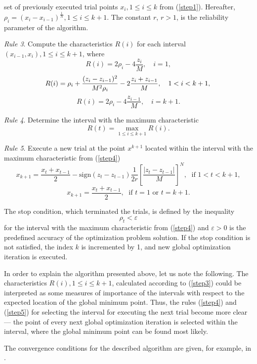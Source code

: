 \documentclass{aims}
\theoremstyle{definition}
\begin{document}
set of previously executed trial points \(x_i,1\leq i\leq k\) from (\ref{step1}).
Hereafter, \(\rho_i=(x_i-x_{i-1})^\frac{1}{N},1\leq i\leq k+1\). The
constant \(r\), \(r>1\), is the reliability parameter of the algorithm.
\par
\textit{Rule 3}. Compute the characteristics \(R(i)\) for each interval \((x_{i-1},x_i),1\leq i\leq k+1\), where
\[
R(i)=2\rho_i-4\frac{z_i}{M},\quad i=1,
\]
\begin{equation} \label{step3}
R(i)=\rho_i+\frac{(z_i-z_{i-1})^2}{M^2\rho_i}-2\frac{z_i+z_{i-1}}{M},\quad 1<i<k+1, \\
\end{equation}
\[
R(i)=2\rho_{i}-4\frac{z_{i-1}}{M},\quad i=k+1.
\]

\par
\textit{Rule 4}. Determine the interval with the maximum characteristic
\begin{equation} \label{step4}
R(t)=\max_{1\leq i \leq k+1}R(i).
\end{equation}
\par
\textit{Rule 5}. Execute a new trial at the point \(x^{k+1}\) located within the interval
with the maximum characteristic from (\ref{step4})
\begin{equation} \label{step5}
  x_{k+1}=\frac{x_t+x_{t-1}}{2}-\mathrm{sign}(z_{t}-z_{t-1})\frac{1}{2r}\left[\frac{|z_{t}-z_{t-1}|}{M}\right]^N,\; \textrm{ if } 1<t<k+1,
\end{equation}
\[
  x_{k+1}=\frac{x_t+x_{t-1}}{2},\; \textrm{ if } t=1 \textrm{ or } t=k+1.
\]

\par
The stop condition, which terminated the trials, is defined by the inequality
\begin{equation}
  \label{eq:stop_1}
\rho_t<\varepsilon
\end{equation}
for the interval with the maximum characteristic from (\ref{step4}) and \(\varepsilon >0\) is the predefined
accuracy of the optimization problem solution. If the stop condition is not satisfied,
the index \(k\) is incremented by 1, and new global optimization iteration is executed.
\par
In order to explain the algorithm presented above, let us note the following.
The characteristics \(R(i), 1\leq i\leq k+1\), calculated according to (\ref{step3}) could
be interpreted as some measures of importance of the intervals with respect to the
expected location of the global minimum point. Thus, the rules (\ref{step4}) and (\ref{step5}) for selecting
the interval for executing the next trial become more clear --- the point of every next
global optimization iteration is selected within the interval, where the global minimum
point can be found most likely.
\par
The convergence conditions for the described algorithm are given, for example, in \cite{strSergGO}.
\end{document}
